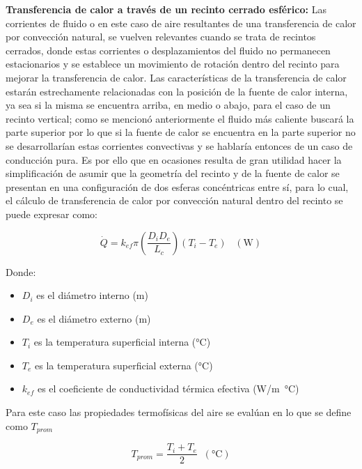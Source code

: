 \textbf{Transferencia de calor a través de un recinto cerrado esférico:} Las corrientes de fluido o en este caso de aire resultantes de una transferencia de calor por convección natural, se vuelven relevantes cuando se trata de recintos cerrados, donde estas corrientes o desplazamientos del fluido no permanecen estacionarios y se establece un  movimiento de rotación dentro del recinto para mejorar la transferencia de calor. Las características de la transferencia de calor estarán estrechamente relacionadas con la posición de la fuente de calor interna, ya sea si la misma se encuentra arriba, en medio o abajo, para el caso de un recinto vertical; como se mencionó anteriormente el fluido más caliente buscará la parte superior por lo que si la fuente de calor se encuentra en la parte superior no se desarrollarían estas corrientes convectivas y se hablaría entonces de un caso de conducción pura. Es por ello que en ocasiones resulta de gran utilidad hacer la simplificación de asumir que la geometría del recinto y de la fuente de calor se presentan en una configuración de dos esferas concéntricas entre sí, para lo cual, el cálculo de transferencia de calor por convección natural dentro del recinto se puede expresar como: \cite{cengel}  

\begin{equation}\label{q2}
    \dot{Q} = k_{ef}\pi\left (\frac{D_{i}D_{e}}{L_{c}}\right )(T_{i}-T_{e}) \; \; \; (\si{\watt})
\end{equation}

Donde:

\begin{itemize}
    \item $D_{i}$ es el diámetro interno (\si{\meter})
    \item $D_{e}$ es el diámetro externo (\si{\meter})
    \item $T_{i}$ es la temperatura superficial interna (\si{\celsius})
    \item $T_{e}$ es la temperatura superficial externa (\si{\celsius})
    \item $k_{ef}$ es el coeficiente de conductividad térmica efectiva (\si{\watt/\meter\celsius})
\end{itemize}

Para este caso las propiedades termofísicas del aire se evalúan en lo que se define como $T_{prom}$

\begin{equation}\label{tprom}
    T_{prom} = \frac{T_{i}+T_{e}}{2}\;\;(\si{\celsius}) 
\end{equation}

